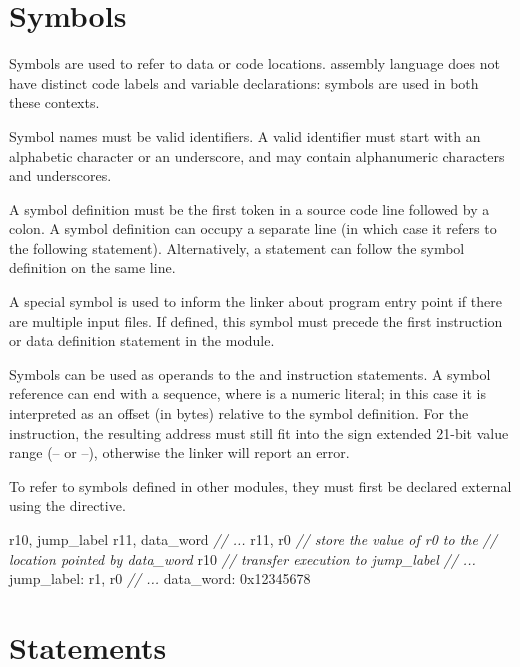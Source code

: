 \documentclass[a4paper,12pt,twoside,extrafontsizes]{memoir}
\begin{document}
\section{Symbols}
\label{sec:symbols}

Symbols are used to refer to data or code locations. \lxp{} assembly language does not have distinct code labels and variable declarations: symbols are used in both these contexts.

Symbol names must be valid identifiers. A valid identifier must start with an alphabetic character or an underscore, and may contain alphanumeric characters and underscores.

A symbol definition must be the first token in a source code line followed by a colon. A symbol definition can occupy a separate line (in which case it refers to the following statement). Alternatively, a statement can follow the symbol definition on the same line.

A special  symbol is used to inform the linker about program entry point if there are multiple input files. If defined, this symbol must precede the first instruction or data definition statement in the module.

Symbols can be used as operands to the  and  instruction statements. A symbol reference can end with a  sequence, where  is a numeric literal; in this case it is interpreted as an offset (in bytes) relative to the symbol definition. For the  instruction, the resulting address must still fit into the sign extended 21-bit value range (-- or --), otherwise the linker will report an error.

To refer to symbols defined in other modules, they must first be declared external using the  directive.

\begin{codeparbreakable}
     r10, jump\_label
     r11, data\_word
\emph{// ...}
     r11, r0 \emph{// store the value of r0 to the}
               \emph{// location pointed by data\_word}
     r10    \emph{// transfer execution to jump\_label}
\emph{// ...}
jump\_label:
     r1, r0
\emph{// ...}
data\_word:
     0x12345678
\end{codeparbreakable}

\section{Statements}
\end{document}
